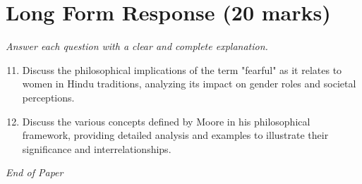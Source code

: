\documentclass[12pt]{article}
\begin{document}
\section*{Long Form Response (20 marks)}
\textit{Answer each question with a clear and complete explanation.}
\begin{enumerate}[label=\arabic*.]
\setcounter{enumi}{10}
\item Discuss the philosophical implications of the term "fearful" as it relates to women in Hindu traditions, analyzing its impact on gender roles and societal perceptions.
\item Discuss the various concepts defined by Moore in his philosophical framework, providing detailed analysis and examples to illustrate their significance and interrelationships.
\end{enumerate}

\vfill
\noindent\textit{End of Paper}
\end{document}
